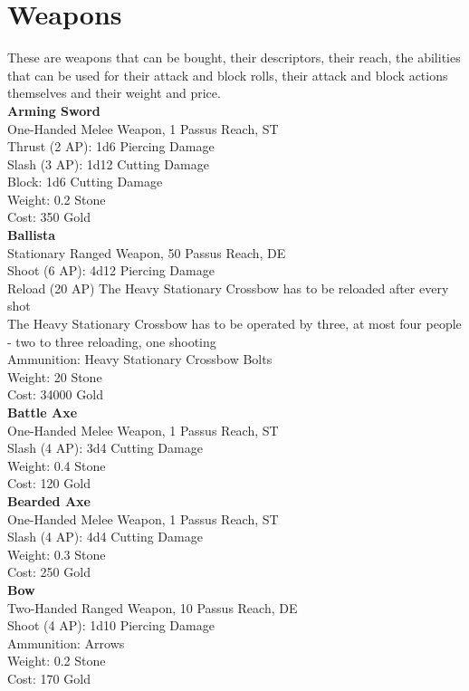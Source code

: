\section{Weapons}
These are weapons that can be bought, their descriptors, their reach, the abilities that can be used for their attack and block rolls, their attack and block actions themselves and their weight and price.\\


\textbf{Arming Sword}\\
One-Handed Melee Weapon, 1 Passus Reach, ST\\
Thrust (2 AP): 1d6 Piercing Damage\\
Slash (3 AP): 1d12 Cutting Damage\\
Block: 1d6 Cutting Damage\\
Weight: 0.2 Stone\\
Cost: 350 Gold\\


\textbf{Ballista}\\
Stationary Ranged Weapon, 50 Passus Reach, DE\\
Shoot (6 AP): 4d12 Piercing Damage\\
Reload (20 AP) The Heavy Stationary Crossbow has to be reloaded after every shot\\
The Heavy Stationary Crossbow has to be operated by three, at most four people - two to three reloading, one shooting\\
Ammunition: Heavy Stationary Crossbow Bolts\\
Weight: 20 Stone\\
Cost: 34000 Gold\\


\textbf{Battle Axe}\\
One-Handed Melee Weapon, 1 Passus Reach, ST\\
Slash (4 AP): 3d4 Cutting Damage\\
Weight: 0.4 Stone\\
Cost: 120 Gold\\


\textbf{Bearded Axe}\\
One-Handed Melee Weapon, 1 Passus Reach, ST\\
Slash (4 AP): 4d4 Cutting Damage\\
Weight: 0.3 Stone\\
Cost: 250 Gold\\


\textbf{Bow}\\
Two-Handed Ranged Weapon, 10 Passus Reach, DE\\
Shoot (4 AP): 1d10 Piercing Damage\\
Ammunition: Arrows\\
Weight: 0.2 Stone\\
Cost: 170 Gold\\


